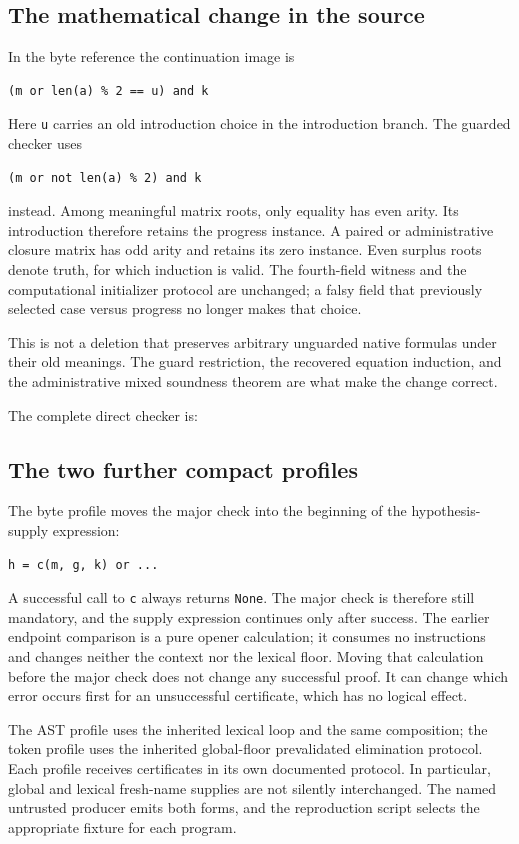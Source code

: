 \subsection{The mathematical change in the source}
In the byte reference the continuation image is
\begin{lstlisting}
(m or len(a) % 2 == u) and k
\end{lstlisting}
Here \texttt{u} carries an old introduction choice in the introduction
branch. The guarded checker uses
\begin{lstlisting}
(m or not len(a) % 2) and k
\end{lstlisting}
instead. Among meaningful matrix roots, only equality has even arity.
Its introduction therefore retains the progress instance. A paired or
administrative closure matrix has odd arity and retains its zero
instance. Even surplus roots denote truth, for which induction is
valid. The fourth-field witness and the computational initializer
protocol are unchanged; a falsy field that previously selected case
versus progress no longer makes that choice.

This is not a deletion that preserves arbitrary unguarded native
formulas under their old meanings. The guard restriction, the recovered
equation induction, and the administrative mixed soundness theorem are
what make the change correct.

The complete direct checker is:


\subsection{The two further compact profiles}
The byte profile  moves the major check into
the beginning of the hypothesis-supply expression:
\begin{lstlisting}
h = c(m, g, k) or ...
\end{lstlisting}
A successful call to \texttt{c} always returns \texttt{None}. The major
check is therefore still mandatory, and the supply expression continues
only after success. The earlier endpoint comparison is a pure opener
calculation; it consumes no instructions and changes neither the context
nor the lexical floor. Moving that calculation before the major check
does not change any successful proof. It can change which error occurs
first for an unsuccessful certificate, which has no logical effect.

The AST profile uses the inherited lexical loop and the same composition;
the token profile uses the inherited global-floor prevalidated
elimination protocol. Each profile receives certificates in its own
documented protocol. In particular, global and lexical fresh-name
supplies are not silently interchanged. The named untrusted producer
emits both forms, and the reproduction script selects the appropriate
fixture for each program.

